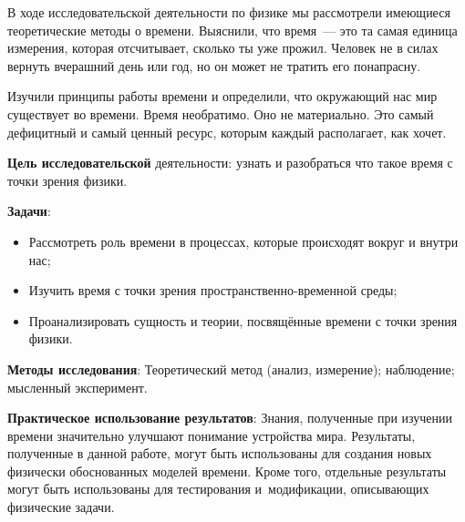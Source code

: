 \bigskip
{}



\makeProcTitleSchool


В ходе исследовательской деятельности по физике мы рассмотрели имеющиеся теоретические методы о времени. Выяснили, что время~--- это та самая единица измерения, которая отсчитывает, сколько ты уже прожил. Человек не в силах вернуть вчерашний день или год, но он может не тратить его понапрасну.

Изучили принципы работы времени и определили, что окружающий нас мир существует во времени. Время необратимо. Оно не материально. Это самый дефицитный и самый ценный ресурс, которым каждый располагает, как хочет.

\textbf{Цель исследовательской} деятельности: узнать и разобраться что такое время с точки зрения физики.

\textbf{Задачи}:
\begin{itemize}[noitemsep]\vspace{-6pt}
\item Рассмотреть роль времени в процессах, которые происходят вокруг и внутри нас;
\item Изучить время с точки зрения пространственно-временной среды;
\item Проанализировать сущность и теории, посвящённые времени с точки зрения физики.
\end{itemize}\vspace{-6pt}

\textbf{Методы исследования}: Теоретический метод (анализ, измерение); наблюдение; мысленный эксперимент.

\textbf{Практическое использование результатов}: Знания, полученные при изучении времени значительно улучшают понимание устройства мира. Результаты, полученные в данной работе, могут быть использованы для создания новых физически обоснованных моделей времени. Кроме того, отдельные результаты могут быть использованы для тестирования и~модификации, описывающих физические задачи.
